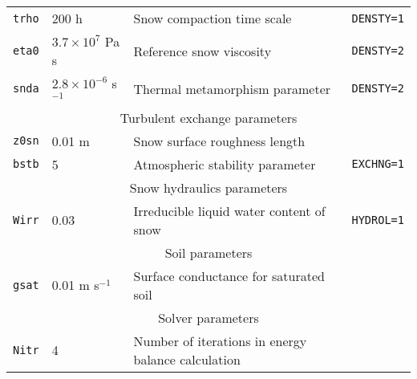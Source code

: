 \documentclass{article}
\begin{document}
\begin{longtable}{|l|l|l|l|}
{\tt trho} & 200 h           & Snow compaction time scale             &{\tt DENSTY=1}   \\
{\tt eta0} & $3.7 \times 10^7$ Pa s  & Reference snow viscosity       &{\tt DENSTY=2}   \\
{\tt snda} & $2.8 \times 10^{-6}$ s$^{-1}$ & Thermal metamorphism parameter &{\tt DENSTY=2} \\
\hline
\hline 
\multicolumn{4}{|c|}{Turbulent exchange parameters} \\
\hline 
{\tt z0sn} & 0.01 m          & Snow surface roughness length          &               \\
{\tt bstb} & 5               & Atmospheric stability parameter        &{\tt EXCHNG=1} \\
\hline
\hline 
\multicolumn{4}{|c|}{Snow hydraulics parameters}                                      \\
\hline
{\tt Wirr} & 0.03          & Irreducible liquid water content of snow &{\tt HYDROL=1} \\
\hline
\hline 
\multicolumn{4}{|c|}{Soil parameters}                                                 \\
\hline 
{\tt gsat} & 0.01 m s$^{-1}$ & Surface conductance for saturated soil &               \\
\hline 
\hline 
\multicolumn{4}{|c|}{Solver parameters}                                               \\
\hline 
{\tt Nitr} & 4      & Number of iterations in energy balance calculation &            \\
\hline 
\end{longtable}
\end{document}
